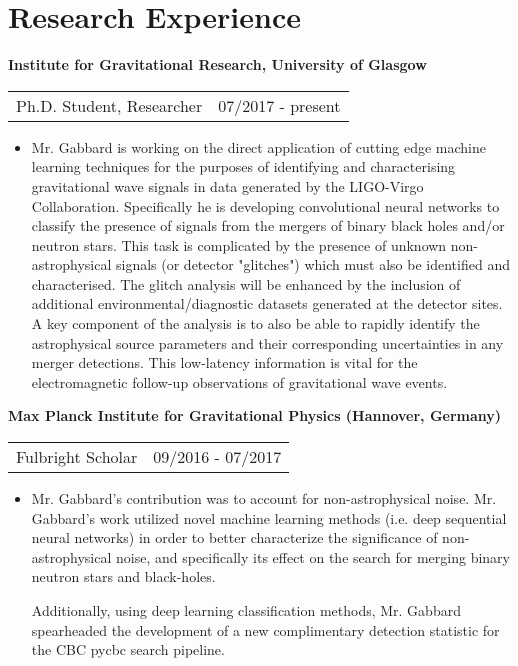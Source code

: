 \section{\sc Research Experience}

{\bf{Institute for Gravitational Research, University of Glasgow}}\\
\begin{tabular}{@{}p{4in}p{2in}}
Ph.D. Student, Researcher & 07/2017 - present\\
\end{tabular}
\begin{itemize}
\setlength\itemsep{0em}
\item Mr. Gabbard is working on the direct application of cutting edge machine learning techniques for the purposes of identifying and characterising gravitational wave signals in data generated by the LIGO-Virgo Collaboration. Specifically he is developing convolutional neural networks to classify the presence of signals from the mergers of binary black holes and/or neutron stars. This task is complicated by the presence of unknown non-astrophysical signals (or detector "glitches") which must also be identified and characterised. The glitch analysis will be enhanced by the inclusion of additional environmental/diagnostic datasets generated at the detector sites. A key component of the analysis is to also be able to rapidly identify the astrophysical source parameters and their corresponding uncertainties in any merger detections. This low-latency information is vital for the electromagnetic follow-up observations of gravitational wave events.
\end{itemize}

{\bf{Max Planck Institute for Gravitational Physics (Hannover, Germany)}}\\
\begin{tabular}{@{}p{4in}p{2in}}
Fulbright Scholar & 09/2016 - 07/2017\\
\end{tabular}
\begin{itemize}
\setlength\itemsep{0em}
\item Mr. Gabbard's contribution was to account for non-astrophysical noise. Mr. Gabbard's work utilized novel machine learning methods (i.e. deep sequential neural networks) in order to better characterize the significance of non-astrophysical noise, and specifically its effect on the search for merging binary neutron stars and black-holes.

Additionally, using deep learning classification methods, Mr. Gabbard spearheaded the development of a new complimentary detection statistic for the CBC pycbc search pipeline.
\end{itemize}

